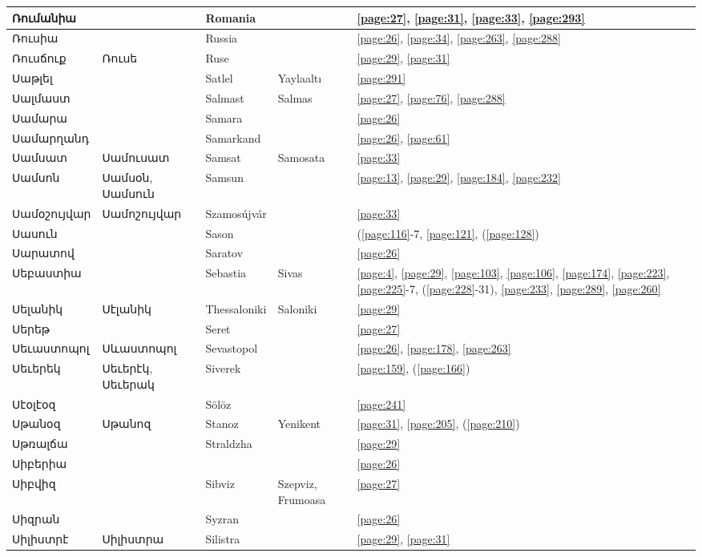 \begin{center}
\begin{longtable}{|p{}|p{3cm}|p{3cm}|p{2cm}|p{3cm}|}
Ռումանիա& & Romania& &\ref{page:27}, \ref{page:31}, \ref{page:33}, \ref{page:293}\\ \hline
Ռուսիա& &Russia & &\ref{page:26}, \ref{page:34}, \ref{page:263}, \ref{page:288}\\ \hline
Ռուսճուք&Ռուսե & Ruse& &\ref{page:29}, \ref{page:31}\\ \hline
Սաթլել& & Satlel&Yaylaaltı &\ref{page:291}\\ \hline
Սալմաստ& &Salmast & Salmas&\ref{page:27}, \ref{page:76}, \ref{page:288}\\ \hline
Սամարա& &Samara & &\ref{page:26}\\ \hline
Սամարղանդ& &Samarkand & &\ref{page:26}, \ref{page:61}\\ \hline
Սամսատ& Սամուսատ& Samsat&Samosata &\ref{page:33}\\ \hline
Սամսոն& Սամսօն, Սամսուն& Samsun& &\ref{page:13}, \ref{page:29}, \ref{page:184}, \ref{page:232}\\ \hline
Սամօշույվար&Սամոշույվար &Szamosújvár &  &\ref{page:33}\\ \hline
Սասուն& & Sason& &(\ref{page:116}-7, \ref{page:121}, (\ref{page:128})\\ \hline
Սարատով& &Saratov & &\ref{page:26}\\ \hline
Սեբաստիա& & 
Sebastia&Sivas &\ref{page:4}, \ref{page:29}, \ref{page:103}, \ref{page:106}, \ref{page:174}, \ref{page:223}, \ref{page:225}-7, (\ref{page:228}-31), \ref{page:233}, \ref{page:289}, \ref{page:260}\\ \hline
Սելանիկ&Սէլանիկ &Thessaloniki &Saloniki &\ref{page:29}\\ \hline
Սերեթ& &Seret & &\ref{page:27}\\ \hline
Սեւաստոպոլ&Սևաստոպոլ &Sevastopol & &\ref{page:26}, \ref{page:178}, \ref{page:263}\\ \hline
Սեւերեկ&Սեւերէկ, Սեւերակ& Siverek& &\ref{page:159}, (\ref{page:166})\\ \hline
Սէօլէօզ& &Sölöz & &\ref{page:241}\\ \hline
Սթանօզ& Սթանոզ& Stanoz &  Yenikent&\ref{page:31}, \ref{page:205}, (\ref{page:210})\\ \hline
Սթռալճա& & Straldzha& &\ref{page:29}\\ \hline
Սիբերիա& & & &\ref{page:26}\\ \hline
Սիբվիզ& &Sibviz &Szepviz, Frumoasa &\ref{page:27}\\ \hline
Սիզրան& & Syzran& &\ref{page:26}\\ \hline
Սիլիստրէ&Սիլիստրա & Silistra& &\ref{page:29}, \ref{page:31}\\ \hline

\end{longtable}
\end{center}
